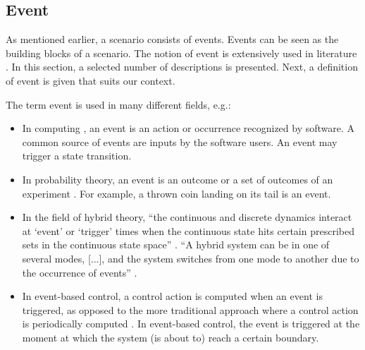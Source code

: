 \subsection{Event}
\label{sec:event}
As mentioned earlier, a scenario consists of events. Events can be seen as the building blocks of a scenario. The notion of event is extensively used in literature \cite{breu1997towards, pfeiffer2013concepts, branicky1998hybridcontrol, deschutter2000optimal, heemels2012eventcontrol}. In this section, a selected number of descriptions is presented. Next, a definition of event is given that suits our context.

The term event is used in many different fields, e.g.:
\begin{itemize}
	\item In computing \cite{breu1997towards}, an event is an action or occurrence recognized by software. A common source of events are inputs by the software users. An event may trigger a state transition.
	\item In probability theory, an event is an outcome or a set of outcomes of an experiment \cite{pfeiffer2013concepts}. For example, a thrown coin landing on its tail is an event.
	\item In the field of hybrid theory, ``the continuous and discrete dynamics interact at `event' or `trigger' times when the continuous state hits certain prescribed sets in the continuous state space'' \cite{branicky1998hybridcontrol}. ``A hybrid system can be in one of several modes, [...], and the system switches from one mode to another due to the occurrence of events'' \cite{deschutter2000optimal}.
	\item In event-based control, a control action is computed when an event is triggered, as opposed to the more traditional approach where a control action is periodically computed \cite{heemels2012eventcontrol}. In event-based control, the event is triggered at the moment at which the system (is about to) reach a certain boundary.
\end{itemize}

